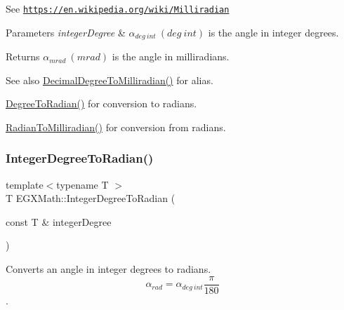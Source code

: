 See \href{https://en.wikipedia.org/wiki/Milliradian}{\tt https\+://en.\+wikipedia.\+org/wiki/\+Milliradian} 
\begin{DoxyParams}{Parameters}
{\em integer\+Degree} & $\alpha_{deg\ int}\ (deg\ int)$ is the angle in integer degrees. \\
\hline
\end{DoxyParams}
\begin{DoxyReturn}{Returns}
$\alpha_{mrad}\ (mrad)$ is the angle in milliradians. 
\end{DoxyReturn}
\begin{DoxySeeAlso}{See also}
\mbox{\hyperlink{group___e_g_x_math-_angle_conversions-_decimal_degree_gab567d02d4692d9642a4ad219e479713a}{Decimal\+Degree\+To\+Milliradian()}} for alias. 

\mbox{\hyperlink{group___e_g_x_math-_angle_conversions-_degree_ga48585541b228c852c9d08a9eac3682f0}{Degree\+To\+Radian()}} for conversion to radians. 

\mbox{\hyperlink{group___e_g_x_math-_angle_conversions-_radian_gaea391f0cca39b05e298dd1cae162e7f1}{Radian\+To\+Milliradian()}} for conversion from radians. 
\end{DoxySeeAlso}
\mbox{\label{group___e_g_x_math-_angle_conversions-_integer_degree_ga05d3368b00ea27b9895de2ffe5c8df38}} 
\subsubsection{\texorpdfstring{Integer\+Degree\+To\+Radian()}{IntegerDegreeToRadian()}}
{\footnotesize\ttfamily template$<$typename T $>$ \\
T E\+G\+X\+Math\+::\+Integer\+Degree\+To\+Radian (\begin{DoxyParamCaption}\item[{const T \&}]{integer\+Degree }\end{DoxyParamCaption})}



Converts an angle in integer degrees to radians. \[\alpha_{rad}=\alpha_{deg\ int}\frac{\pi}{180}\]. 

